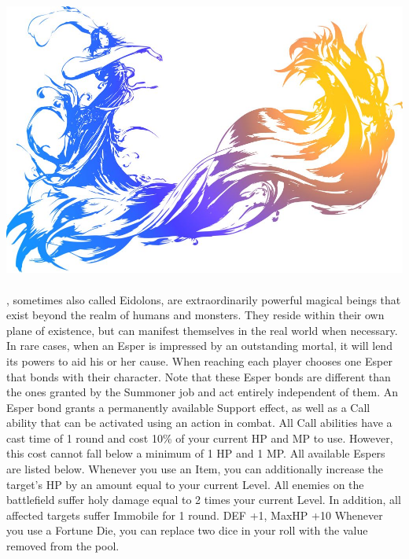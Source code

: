 %
\\\\
%
\includegraphics[width=\columnwidth]{./art/images/ff10.jpg}\\\\
%
, sometimes also called Eidolons, are extraordinarily powerful magical beings that exist beyond the realm of humans and monsters.
They reside within their own plane of existence, but can manifest themselves in the real world when necessary.
In rare cases, when an Esper is impressed by an outstanding mortal, it will lend its powers to aid his or her cause.
When reaching  each player chooses one Esper that bonds with their character.
Note that these Esper bonds are different than the ones granted by the Summoner job and act entirely independent of them.
An Esper bond grants a permanently available Support effect, as well as a Call ability that can be activated using an action in combat. 
All Call abilities have a cast time of 1 round and cost 10\% of your current HP and MP to use.
However, this cost cannot fall below a minimum of 1 HP and 1 MP.
All available Espers are listed below.
%
\vfill
%
{Whenever you use an Item, you can additionally increase the target's HP by an amount equal to your current Level.}
{All enemies on the battlefield suffer holy damage equal to 2 times your current Level. In addition, all affected targets suffer Immobile for 1 round.}
{DEF +1, MaxHP +10}
%
\vfill
%
{Whenever you use a Fortune Die, you can replace two dice in your roll with the value removed from the pool.}
